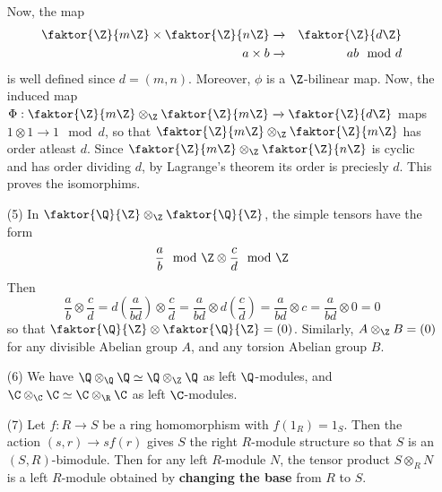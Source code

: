 \begin{example}
\begin{enumerate}
            Now, the map
            \begin{eqnarray*}
                \faktor{\Z}{m\Z} \times \faktor{\Z}{n\Z} & \xrightarrow{} &
                                             \faktor{\Z}{d\Z}   \\
                a \times b     & \xrightarrow{} & ab \mod{d}   \\
            \end{eqnarray*}
            is well defined since $d=(m,n)$. Moreover, $\phi$ is a $\Z$-bilinear
            map. Now, the induced map $\Phi:\faktor{\Z}{m\Z} \otimes_\Z
            \faktor{\Z}{m\Z} \xrightarrow{} \faktor{\Z}{d\Z}$ maps $1 \otimes 1
            \xrightarrow{} 1 \mod{d}$, so that $\faktor{\Z}{m\Z} \otimes_\Z
            \faktor{\Z}{m\Z}$ has order atleast $d$. Since $\faktor{\Z}{m\Z}
            \otimes_\Z \faktor{\Z}{n\Z}$ is cyclic and has order dividing $d$,
            by Lagrange's theorem its order is preciesly $d$. This proves the
            isomorphims.

        \item[(5)] In $\faktor{\Q}{\Z} \otimes_\Z \faktor{\Q}{\Z}$, the simple
            tensors have the form
            \begin{equation*}
                \frac{a}{b} \mod{\Z} \otimes \frac{c}{d} \mod{\Z}
            \end{equation*}
            Then
            \begin{equation*}
                \frac{a}{b} \otimes \frac{c}{d}=
                d(\frac{a}{bd}) \otimes \frac{c}{d}=
                \frac{a}{bd} \otimes d(\frac{c}{d})=
                \frac{a}{bd} \otimes c=
                \frac{a}{bd} \otimes 0=0
            \end{equation*}
            so that $\faktor{\Q}{\Z} \otimes \faktor{\Q}{\Z}=(0)$. Similarly, $A
            \otimes_\Z B=(0)$ for any divisible Abelian group $A$, and any
            torsion Abelian group $B$.

        \item[(6)] We have $\Q \otimes_\Q \Q \simeq \Q \otimes_\Z \Q$ as left
            $\Q$-modules, and $\C \otimes_\C \C \simeq \C \otimes_\R \C$ as left
            $\C$-modules.

        \item[(7)] Let $f:R \xrightarrow{} S$ be a ring homomorphism with
            $f(1_R)=1_S$. Then the action $(s,r) \xrightarrow{} sf(r)$ gives $S$
            the right $R$-module structure so that $S$ is an  $(S,R)$-bimodule.
            Then for any left $R$-module  $N$, the tensor product $S \otimes_R
            N$ is a left $R$-module obtained by \textbf{changing the base} from
            $R$ to  $S$.


\end{enumerate}
\end{example}
